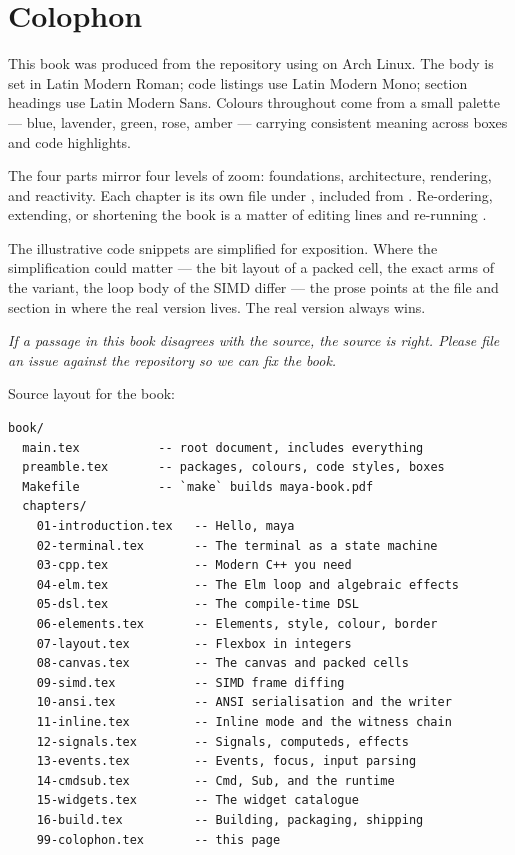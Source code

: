 \chapter*{Colophon}

This book was produced from the \agentty{} repository using
 on Arch Linux. The body is set in Latin Modern Roman;
code listings use Latin Modern Mono; section headings use Latin Modern
Sans. Colours throughout come from a small palette --- \textcolor{mayablue}{blue},
\textcolor{mayalavender}{lavender}, \textcolor{mayagreen}{green},
\textcolor{mayarose}{rose}, \textcolor{mayaamber}{amber} --- carrying
consistent meaning across boxes and code highlights.

The four parts mirror four levels of zoom: foundations, architecture,
rendering, and reactivity. Each chapter is its own  file
under , included from . Re-ordering,
extending, or shortening the book is a matter of editing
 lines and re-running .

The illustrative code snippets are simplified for exposition. Where
the simplification could matter --- the bit layout of a packed cell,
the exact arms of the  variant, the loop body of the
SIMD differ --- the prose points at the file and section in \maya{}
where the real version lives. The real version always wins.

\medskip

\textit{If a passage in this book disagrees with the source, the
source is right. Please file an issue against the \agentty{}
repository so we can fix the book.}

\medskip

\noindent Source layout for the book:

\begin{verbatim}
book/
  main.tex           -- root document, includes everything
  preamble.tex       -- packages, colours, code styles, boxes
  Makefile           -- `make` builds maya-book.pdf
  chapters/
    01-introduction.tex   -- Hello, maya
    02-terminal.tex       -- The terminal as a state machine
    03-cpp.tex            -- Modern C++ you need
    04-elm.tex            -- The Elm loop and algebraic effects
    05-dsl.tex            -- The compile-time DSL
    06-elements.tex       -- Elements, style, colour, border
    07-layout.tex         -- Flexbox in integers
    08-canvas.tex         -- The canvas and packed cells
    09-simd.tex           -- SIMD frame diffing
    10-ansi.tex           -- ANSI serialisation and the writer
    11-inline.tex         -- Inline mode and the witness chain
    12-signals.tex        -- Signals, computeds, effects
    13-events.tex         -- Events, focus, input parsing
    14-cmdsub.tex         -- Cmd, Sub, and the runtime
    15-widgets.tex        -- The widget catalogue
    16-build.tex          -- Building, packaging, shipping
    99-colophon.tex       -- this page
\end{verbatim}

